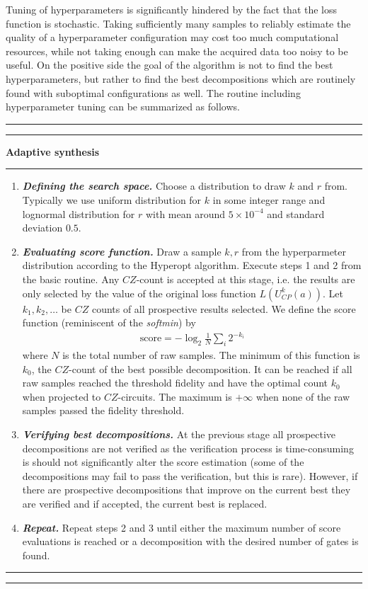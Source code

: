\documentclass[amsfonts, amssymb, aps, nofootinbib, twocolumn]{revtex4-2}
\begin{document}
Tuning of hyperparameters is significantly hindered by the fact that the loss function is stochastic. Taking sufficiently many samples to reliably estimate the quality of a hyperparameter configuration may cost too much computational resources, while not taking enough can make the acquired data too noisy to be useful. On the positive side the goal of the algorithm is not to find the best hyperparameters, but rather to find the best decompositions which are routinely found with suboptimal configurations as well. The routine including hyperparameter tuning can be summarized as follows.
\\[6pt]
\hrule
\hrule
\vspace{6pt}
{\large\textbf{\qquad Adaptive synthesis}}
\vspace{6pt}
\hrule
\begin{enumerate}
\item \textit{\textbf{Defining the search space.}} Choose a distribution to draw $k$ and $r$ from. Typically we use uniform distribution for $k$ in some integer range and lognormal distribution for $r$ with mean around $5\times 10^{-4}$ and standard deviation $0.5$.
\item \textit{\textbf{Evaluating score function.}} Draw a sample $k, r$ from the hyperparmeter distribution according to the Hyperopt algorithm. Execute steps 1 and 2 from the basic routine. Any $CZ$-count is accepted at this stage, i.e. the results are only selected by the value of the original loss function $L(U_{CP}^k(a))$. Let $k_1, k_2,\dots$ be $CZ$ counts of all prospective results selected. We define the score function (reminiscent of the \textit{softmin}) by 
\begin{align}
\text{score}=-\log_2\frac{1}{N}\sum_{i}2^{-k_i} \label{score}
\end{align}
where $N$ is the total number of raw samples. The minimum of this function is $k_0$, the $CZ$-count of the best possible decomposition. It can be reached if all raw samples reached the threshold fidelity and have the optimal count $k_0$ when projected to $CZ$-circuits. The maximum is $+\infty$ when none of the raw samples passed the fidelity threshold.
\item \textit{\textbf{Verifying best decompositions.}} At the previous stage all prospective decompositions are not verified as the verification process is time-consuming is should not significantly alter the score estimation (some of the decompositions may fail to pass the verification, but this is rare). However, if there are prospective decompositions that improve on the current best they are verified and if accepted, the current best is replaced.

\item \textit{\textbf{Repeat.}} Repeat steps 2 and 3 until either the maximum number of score evaluations is reached or a decomposition with the desired number of gates is found.
\end{enumerate}
\hrule
\hrule
\end{document}
